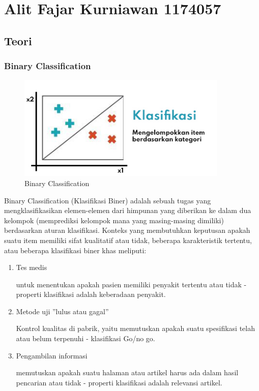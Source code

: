 \section{Alit Fajar Kurniawan 1174057}
\subsection{Teori}

\subsubsection{Binary Classification}
\begin{figure}[H]
\centerline{\includegraphics[width=10cm]{figures/1174057/chapter2/1.jpg}}
\caption{Binary Classification}
\label{labelgambar}
\end{figure}
Binary Classification (Klasifikasi Biner) adalah sebuah tugas yang mengklasifikasikan elemen-elemen dari himpunan yang diberikan ke dalam dua kelompok (memprediksi kelompok mana yang masing-masing dimiliki) berdasarkan aturan klasifikasi. Konteks yang membutuhkan keputusan apakah suatu item memiliki sifat kualitatif atau tidak, beberapa karakteristik tertentu, atau beberapa klasifikasi
biner khas meliputi:
\begin{enumerate}
\item Tes medis 

untuk menentukan apakah pasien memiliki penyakit tertentu atau tidak - properti klasifikasi adalah keberadaan penyakit.

\item Metode uji ”lulus atau gagal”

Kontrol kualitas di pabrik, yaitu memutuskan apakah suatu spesifikasi telah atau belum terpenuhi - klasifikasi Go/no go.

\item Pengambilan informasi

memutuskan apakah suatu halaman atau artikel harus ada dalam hasil pencarian atau tidak - properti klasifikasi adalah relevansi artikel.
\end{enumerate}

